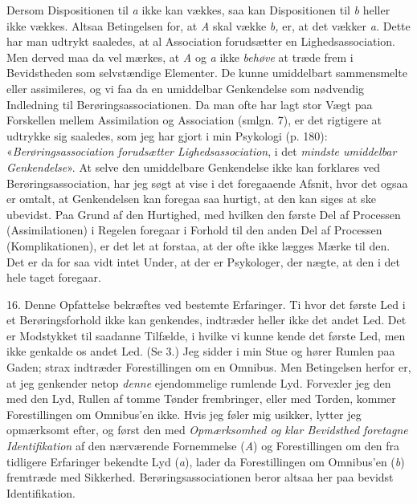 \documentclass[12pt,a4paper,openany]{book}
\newcommand{\opage}[1]{\marginnote{\footnotesize\textit{[#1]}}}
\begin{document}
Dersom Dispositionen til \textit{a} ikke kan vækkes, saa kan Dispositionen til
\textit{b} heller ikke
\setcounter{footnote}{0}%
\opage{38}vækkes. Altsaa Betingelsen for, at \textit{A} skal vække \textit{b,}
er, at det vækker \textit{a.} Dette har man udtrykt saaledes, at al Association
forudsætter en Lighedsassociation. Men derved maa da vel mærkes, at \textit{A}
og \textit{a} ikke \emph{behøve} at træde frem i Bevidstheden som selvstændige
Elementer. De kunne umiddelbart sammensmelte eller assimileres, og vi faa da en
umiddelbar Genkendelse som nødvendig Indledning til Berøringsassociationen. Da
man ofte har lagt stor Vægt paa Forskellen mellem Assimilation og Association
(smlgn. 7), er det rigtigere at udtrykke sig saaledes, som jeg har gjort i min
Psykologi (p. 180): «\emph{Berøringsassociation forudsætter
Lighedsassociation}, i det \emph{mindste umiddelbar Genkendelse}». At selve den
umiddelbare Genkendelse ikke kan forklares ved Berøringsassociation, har jeg
søgt at vise i det foregaaende Afsnit, hvor det ogsaa er omtalt, at
Genkendelsen kan foregaa saa hurtigt, at den kan siges at ske ubevidst. Paa
Grund af den Hurtighed, med hvilken den første Del af Processen
(Assimilationen) i Regelen foregaar i Forhold til den anden Del af Processen
(Komplikationen), er det let at forstaa, at der ofte ikke lægges Mærke til den.
Det er da for saa vidt intet Under, at der er Psykologer, der nægte, at den i
det hele taget foregaar.

16. Denne Opfattelse bekræftes ved bestemte Erfaringer. Ti hvor det første Led
i et Berøringsforhold ikke kan genkendes, indtræder heller ikke det andet Led.
Det er Modstykket til saadanne Tilfælde, i hvilke vi kunne kende det første
Led, men ikke genkalde os andet Led. (Se 3.) Jeg sidder i min Stue og hører
Rumlen paa Gaden; strax indtræder Forestillingen om en Omnibus. Men Betingelsen
herfor er, at jeg genkender netop \emph{denne} ejendommelige rumlende Lyd.
Forvexler jeg den med den Lyd, Rullen af tomme Tønder frembringer, eller med
Torden, kommer Forestillingen om Omnibus'en ikke. Hvis jeg føler mig usikker,
lytter jeg opmærksomt efter, og først den med \emph{Opmærksomhed og klar
Bevidsthed foretagne Identifikation} af den nærværende Fornemmelse (\textit{A})
og Forestillingen om den fra tidligere Erfaringer bekendte Lyd (\textit{a}),
lader da Forestillingen om Omnibus'en (\textit{b}) fremtræde med Sikkerhed.
Berøringsassociationen beror altsaa her paa bevidst Identifikation.
\end{document}

